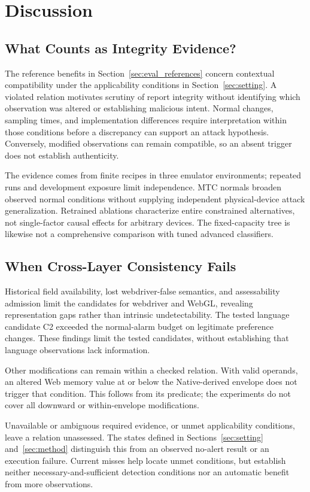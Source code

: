 \section{Discussion}
\label{sec:limits}
\subsection{What Counts as Integrity Evidence?}
The reference benefits in Section~\ref{sec:eval_references} concern contextual compatibility under the applicability conditions in Section~\ref{sec:setting}. A violated relation motivates scrutiny of report integrity without identifying which observation was altered or establishing malicious intent. Normal changes, sampling times, and implementation differences require interpretation within those conditions before a discrepancy can support an attack hypothesis. Conversely, modified observations can remain compatible, so an absent trigger does not establish authenticity.

The evidence comes from finite recipes in three emulator environments; repeated runs and development exposure limit independence. MTC normals broaden observed normal conditions without supplying independent physical-device attack generalization. Retrained ablations characterize entire constrained alternatives, not single-factor causal effects for arbitrary devices. The fixed-capacity tree is likewise not a comprehensive comparison with tuned advanced classifiers.

\subsection{When Cross-Layer Consistency Fails}
Historical field availability, lost webdriver-false semantics, and assessability admission limit the candidates for webdriver and WebGL, revealing representation gaps rather than intrinsic undetectability. The tested language candidate C2 exceeded the normal-alarm budget on legitimate preference changes. These findings limit the tested candidates, without establishing that language observations lack information.

Other modifications can remain within a checked relation. With valid operands, an altered Web memory value at or below the Native-derived envelope does not trigger that condition. This follows from its predicate; the experiments do not cover all downward or within-envelope modifications.

Unavailable or ambiguous required evidence, or unmet applicability conditions, leave a relation unassessed. The states defined in Sections~\ref{sec:setting} and~\ref{sec:method} distinguish this from an observed no-alert result or an execution failure. Current misses help locate unmet conditions, but establish neither necessary-and-sufficient detection conditions nor an automatic benefit from more observations.

